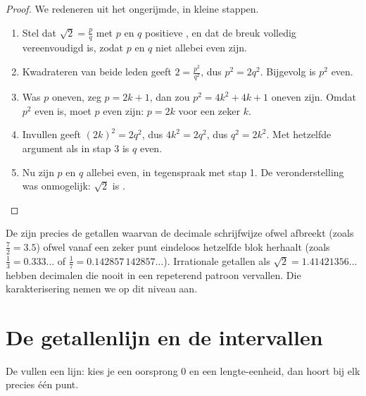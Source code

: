 \begin{proof}
We redeneren uit het ongerijmde, in kleine stappen.
\begin{enumerate}
  \item Stel dat $\sqrt 2 = \frac{p}{q}$ met $p$ en $q$ positieve , en dat de breuk volledig vereenvoudigd is, zodat $p$ en $q$
        niet allebei even zijn.
  \item Kwadrateren van beide leden geeft $2 = \frac{p^2}{q^2}$, dus
        $p^2 = 2q^2$. Bijgevolg is $p^2$ even.
  \item Was $p$ oneven, zeg $p = 2k+1$, dan zou $p^2 = 4k^2 + 4k + 1$ oneven
        zijn. Omdat $p^2$ even is, moet $p$ even zijn: $p = 2k$ voor een zeker
         $k$.
  \item Invullen geeft $(2k)^2 = 2q^2$, dus $4k^2 = 2q^2$, dus $q^2 = 2k^2$.
        Met hetzelfde argument als in stap 3 is $q$ even.
  \item Nu zijn $p$ en $q$ allebei even, in tegenspraak met stap 1. De
        veronderstelling was onmogelijk: $\sqrt 2$ is .
\end{enumerate}
\end{proof}

\begin{remark}
De  zijn precies de getallen waarvan de decimale
schrijfwijze ofwel afbreekt (zoals $\frac72 = 3.5$) ofwel vanaf een zeker
punt eindeloos hetzelfde blok herhaalt (zoals $\frac13 = 0.333\dots$ of
$\frac{1}{7} = 0.142857\,142857\dots$). Irrationale getallen als
$\sqrt2 = 1.41421356\dots$ hebben decimalen die nooit in een repeterend
patroon vervallen. Die karakterisering nemen we op dit niveau aan.
\end{remark}

\section{De getallenlijn en de intervallen}

De  vullen een lijn: kies je een oorsprong $0$ en een
lengte-eenheid, dan hoort bij elk  precies één punt.

